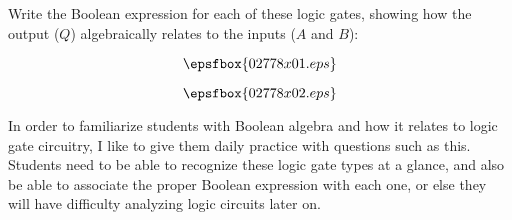 

Write the Boolean expression for each of these logic gates, showing how the output ($Q$) algebraically relates to the inputs ($A$ and $B$):

$$\epsfbox{02778x01.eps}$$







$$\epsfbox{02778x02.eps}$$







In order to familiarize students with Boolean algebra and how it relates to logic gate circuitry, I like to give them daily practice with questions such as this.  Students need to be able to recognize these logic gate types at a glance, and also be able to associate the proper Boolean expression with each one, or else they will have difficulty analyzing logic circuits later on.




